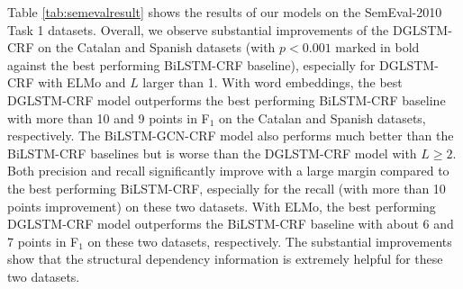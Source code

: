 Table \ref{tab:semevalresult} shows the results of our models on the SemEval-2010 Task 1 datasets.
Overall, we observe substantial improvements of the DGLSTM-CRF on the Catalan and Spanish datasets (with $p<0.001$ marked in bold against the best performing BiLSTM-CRF baseline), especially for DGLSTM-CRF with ELMo and $L$ larger than 1.  
With word embeddings, the best DGLSTM-CRF model outperforms the best performing BiLSTM-CRF baseline with more than 10 and 9 points in  F$_1$  on the Catalan and Spanish datasets, respectively. 
The BiLSTM-GCN-CRF model also performs much better than the BiLSTM-CRF baselines but is worse than the DGLSTM-CRF model with $L\geq 2$. 
Both precision and recall significantly improve with a large margin compared to the best performing BiLSTM-CRF, especially for the recall (with more than 10 points improvement) on these two datasets. 
With ELMo, the best performing DGLSTM-CRF model outperforms the BiLSTM-CRF baseline with about 6 and 7 points in F$_1$ on these two datasets, respectively. 
The substantial improvements show that the structural dependency information is extremely helpful for these two datasets. 



